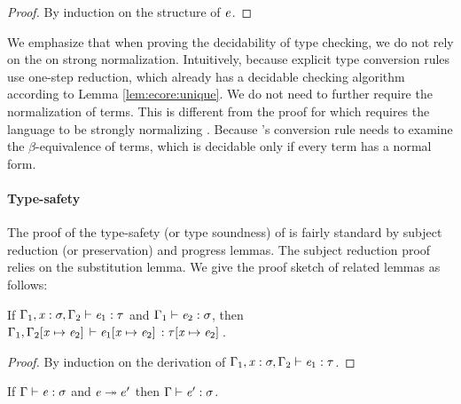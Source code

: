 \begin{proof}
	By induction on the structure of $\mathit{e}$.
\end{proof}

We emphasize that when proving the decidability of type checking, we do not rely on the
on strong normalization. Intuitively, because explicit type conversion rules use one-step
reduction, which already has a decidable checking algorithm according to Lemma
\ref{lem:ecore:unique}. We do not need to further require the normalization of
terms. This is different from the proof for \cc which requires the
language to be strongly
normalizing \cite{pts:normalize}. Because \cc's conversion rule needs to
examine the $\beta$-equivalence of terms, which is decidable only if every term
has a normal form.

\paragraph{Type-safety}
The proof of the type-safety (or type soundness) of \ecore is fairly standard by subject
reduction (or preservation) and progress lemmas. The subject reduction proof
relies on the substitution lemma. We give the proof sketch of related lemmas as
follows:

\begin{lem}[Substitution]\label{lem:ecore:subst}
	If $\Gamma_{{\mathrm{1}}}  ,  \mathit{x}  :  \sigma  ,  \Gamma_{{\mathrm{2}}}  \vdash  \mathit{e_{{\mathrm{1}}}}  :  \tau$ and $\Gamma_{{\mathrm{1}}}  \vdash  \mathit{e_{{\mathrm{2}}}}  :  \sigma$, then $\Gamma_{{\mathrm{1}}}  ,  \Gamma_{{\mathrm{2}}}  [  \mathit{x}  \mapsto  \mathit{e_{{\mathrm{2}}}}  ] \,  \vdash  \mathit{e_{{\mathrm{1}}}}  [  \mathit{x}  \mapsto  \mathit{e_{{\mathrm{2}}}}  ] \,  :  \tau  [  \mathit{x}  \mapsto  \mathit{e_{{\mathrm{2}}}}  ] \,$.
\end{lem}

\begin{proof}
    By induction on the derivation of $\Gamma_{{\mathrm{1}}}  ,  \mathit{x}  :  \sigma  ,  \Gamma_{{\mathrm{2}}}  \vdash  \mathit{e_{{\mathrm{1}}}}  :  \tau$.
\end{proof}

\begin{thm}\label{lem:ecore:reduct}
If $\Gamma  \vdash  \mathit{e}  :  \sigma$ and $\mathit{e}  \twoheadrightarrow  e'$ then $\Gamma  \vdash  \mathit{e'}  :  \sigma$.
\end{thm}

